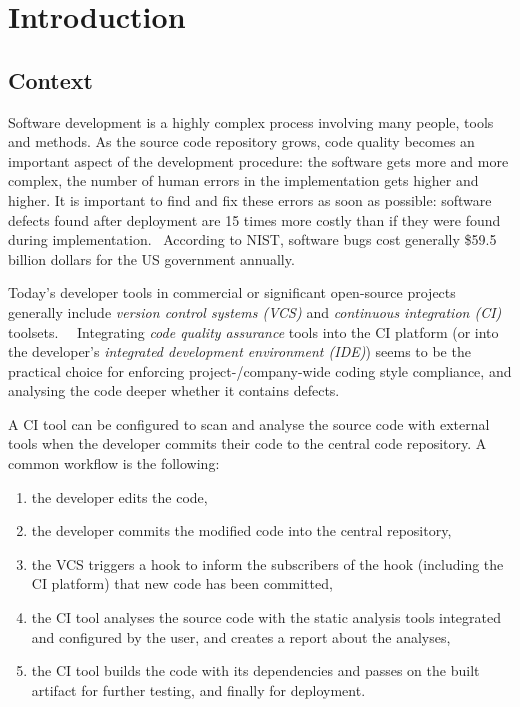 \chapter{Introduction}


\section{Context}

Software development is a highly complex process involving many people, tools and methods. As the source code repository grows, code quality becomes an important aspect of the development procedure: the software gets more and more complex, the number of human errors in the implementation gets higher and higher. It is important to find and fix these errors as soon as possible: software defects found after deployment are 15 times more costly than if they were found during implementation.~\cite{dawson2010integrating} According to NIST, software bugs cost generally \$59.5 billion dollars for the US government annually.~\cite{tassey2002economic}

Today's developer tools in commercial or significant open-source projects generally include \emph{version control systems (VCS)} and \emph{continuous integration (CI)} toolsets.~\cite{hilton2016usage}~\cite{fowlerCI} Integrating \emph{code quality assurance} tools into the CI platform (or into the developer's \emph{integrated development environment (IDE)}) seems to be the practical choice for enforcing project-/company-wide coding style compliance, and analysing the code deeper whether it contains defects.

A CI tool can be configured to scan and analyse the source code with external tools when the developer commits their code to the central code repository. A common workflow is the following:

\begin{enumerate}
\item the developer edits the code,
\item the developer commits the modified code into the central repository,
\item the VCS triggers a hook to inform the subscribers of the hook (including the CI platform) that new code has been committed,
\item the CI tool analyses the source code with the static analysis tools integrated and configured by the user, and creates a report about the analyses,
\item the CI tool builds the code with its dependencies and passes on the built artifact for further testing, and finally for deployment.
\end{enumerate}

